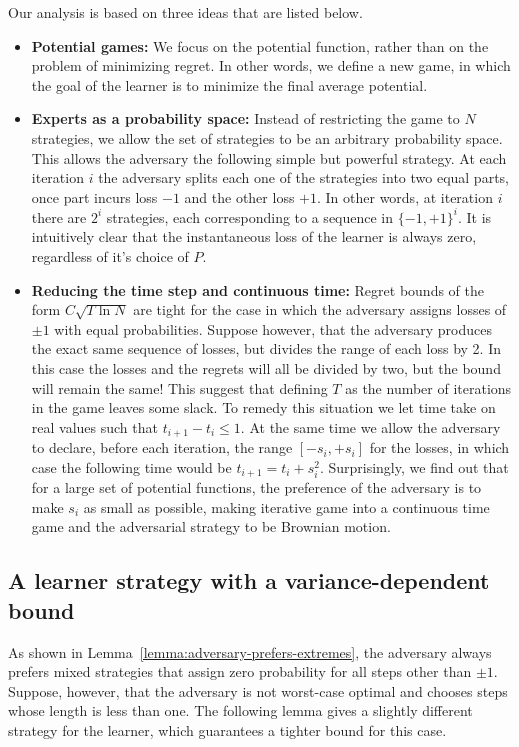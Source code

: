 Our analysis is based on three ideas that are listed below.
\begin{itemize}
    \item {\bf Potential games:} We focus on the potential function, rather than on the problem of minimizing regret. In other words, we define a new game, in which the goal of the learner is to minimize  the final average potential.
    \item {\bf Experts as a probability space:} Instead of restricting the game to $N$ strategies, we allow the set of strategies to be an arbitrary probability space. This allows the adversary the following simple but powerful strategy.  At each iteration $i$ the adversary splits each one of the strategies into two equal parts, once part incurs loss $-1$ and the other loss $+1$. In other words, at iteration $i$ there are $2^i$ strategies, each corresponding to a sequence in $\{-1,+1\}^i$. It is intuitively clear that the instantaneous loss of the learner is always zero, regardless of it's choice of $P$.
    \item {\bf Reducing the time step and continuous time:} Regret bounds of the form $C\sqrt{T \ln N}$ are tight for the case in which the adversary assigns losses of $\pm 1$ with equal probabilities.
    Suppose however, that the adversary produces the exact same sequence of losses, but divides the range of each loss by 2. In this case the losses and the regrets will all be divided by two, but the bound will remain the same! This suggest that defining $T$ as the number of iterations in the game leaves some slack. To remedy this situation we let time take on real values such that $t_{i+1}-t_i \leq 1$. At the same time we 
    allow the adversary to declare, before each iteration, the range $[-s_i,+s_i]$ for the losses, in which case the following time would be 
    $t_{i+1}=t_i +s_i^2$. Surprisingly, we find out that for a large set of potential functions, the preference of the adversary is to make $s_i$ as small as possible, making iterative game into a continuous time game and the adversarial strategy to be Brownian motion.
\end{itemize}

  \subsection{A learner strategy with a variance-dependent bound}

  As shown in Lemma~\ref{lemma:adversary-prefers-extremes}, the
  adversary always prefers mixed strategies that assign zero
  probability for all steps other than $\pm 1$. Suppose, however, that
  the adversary is not worst-case optimal and chooses steps whose
  length is less than one. The following lemma gives a slightly
  different strategy for the learner, which guarantees a tighter bound
  for this case.


